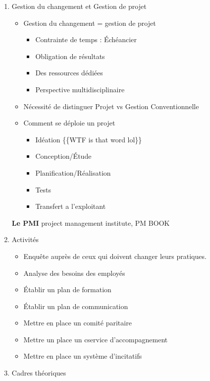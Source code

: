 \documentclass[11pt]{article}
\begin{document}
\begin{enumerate}
\begin{enumerate}
\begin{enumerate}
\begin{enumerate}
\noindent\rule{\textwidth}{0.5pt}

\item Gestion du changement et Gestion de projet
\label{sec:org196949e}

\begin{itemize}
\item Gestion du changement = gestion de projet
\begin{itemize}
\item Contrainte de temps : Échéancier
\item Obligation de résultats
\item Des ressources dédiées
\item Perspective multidisciplinaire
\end{itemize}
\item Nécessité de distinguer Projet vs Gestion Conventionnelle
\item Comment se déploie un projet
\begin{itemize}
\item Idéation \{\{WTF is that word lol\}\}
\item Conception/Étude
\item Planification/Réalisation
\item Tests
\item Transfert a l'exploitant
\end{itemize}
\end{itemize}

\textbf{Le PMI} project management institute, PM BOOK

\item Activités
\label{sec:org95c79d0}
\begin{itemize}
\item Enquête auprès de ceux qui doivent changer leurs pratiques.
\item Analyse des besoins des employés
\item Établir un plan de formation
\item Établir un plan de communication
\item Mettre en place un comité paritaire
\item Mettre un place un cservice d'accompagnement
\item Mettre en place un système d'incitatifs
\end{itemize}
\item Cadres théoriques
\label{sec:org46ec88f}


\end{enumerate}
\end{enumerate}
\end{enumerate}
\end{enumerate}
\end{document}
